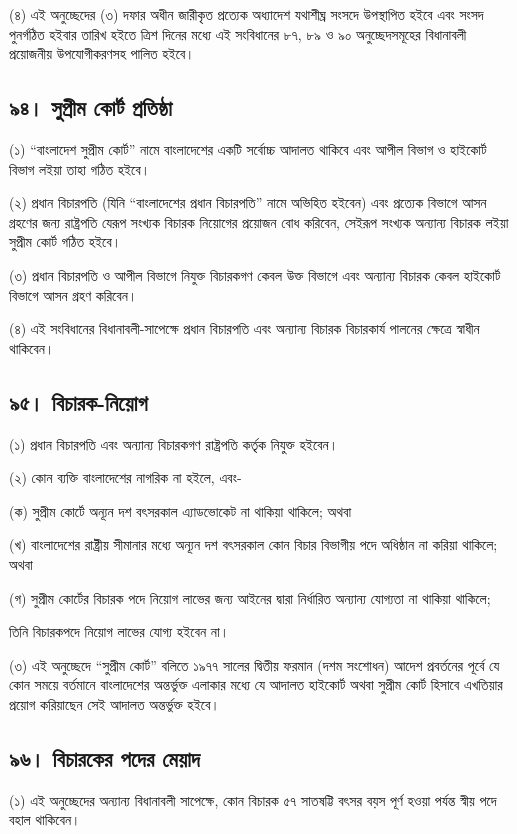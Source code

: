 \documentclass[11pt]{article}
\begin{document}
(৪) এই অনুচ্ছেদের (৩) দফার অধীন জারীকৃত প্রত্যেক অধ্যাদেশ যথাশীঘ্র সংসদে
    উপস্থাপিত হইবে এবং সংসদ পুনর্গঠিত হইবার তারিখ হইতে ত্রিশ দিনের মধ্যে এই
    সংবিধানের ৮৭, ৮৯ ও ৯০ অনুচ্ছেদসমূহের বিধানাবলী প্রয়োজনীয় উপযোগীকরণসহ পালিত
    হইবে।

\subsection{৯৪। সুপ্রীম কোর্ট প্রতিষ্ঠা}
\label{sec:orgaefd4ce}
(১) “বাংলাদেশ সুপ্রীম কোর্ট” নামে বাংলাদেশের একটি সর্বোচ্চ আদালত থাকিবে
    এবং আপীল বিভাগ ও হাইকোর্ট বিভাগ লইয়া তাহা গঠিত হইবে।

(২) প্রধান বিচারপতি (যিনি “বাংলাদেশের প্রধান বিচারপতি” নামে অভিহিত
    হইবেন) এবং প্রত্যেক বিভাগে আসন গ্রহণের জন্য রাষ্ট্রপতি যেরূপ সংখ্যক বিচারক
    নিয়োগের প্রয়োজন বোধ করিবেন, সেইরূপ সংখ্যক অন্যান্য বিচারক লইয়া সুপ্রীম কোর্ট
    গঠিত হইবে।

(৩) প্রধান বিচারপতি ও আপীল বিভাগে নিযুক্ত বিচারকগণ কেবল উক্ত বিভাগে এবং
    অন্যান্য বিচারক কেবল হাইকোর্ট বিভাগে আসন গ্রহণ করিবেন।

(৪) এই সংবিধানের বিধানাবলী-সাপেক্ষে প্রধান বিচারপতি এবং অন্যান্য বিচারক
    বিচারকার্য পালনের ক্ষেত্রে স্বাধীন থাকিবেন।

\subsection{৯৫। বিচারক-নিয়োগ}
\label{sec:org72ac0b0}
(১) প্রধান বিচারপতি এবং অন্যান্য বিচারকগণ রাষ্ট্রপতি কর্তৃক নিযুক্ত হইবেন।

(২) কোন ব্যক্তি বাংলাদেশের নাগরিক না হইলে, এবং-

(ক) সুপ্রীম কোর্টে অন্যূন দশ বৎসরকাল এ্যাডভোকেট না থাকিয়া থাকিলে; অথবা

(খ) বাংলাদেশের রাষ্ট্রীয় সীমানার মধ্যে অন্যূন দশ বৎসরকাল কোন বিচার বিভাগীয়
    পদে অধিষ্ঠান না করিয়া থাকিলে; অথবা

(গ) সুপ্রীম কোর্টের বিচারক পদে নিয়োগ লাভের জন্য আইনের দ্বারা নির্ধারিত
    অন্যান্য যোগ্যতা না থাকিয়া থাকিলে;

তিনি বিচারকপদে নিয়োগ লাভের যোগ্য হইবেন না।

(৩) এই অনুচ্ছেদে “সুপ্রীম কোর্ট” বলিতে ১৯৭৭ সালের দ্বিতীয় ফরমান (দশম সংশোধন)
    আদেশ প্রবর্তনের পূর্বে যে কোন সময়ে বর্তমানে বাংলাদেশের অন্তর্ভুক্ত এলাকার মধ্যে
    যে আদালত হাইকোর্ট অথবা সুপ্রীম কোর্ট হিসাবে এখতিয়ার প্রয়োগ করিয়াছেন সেই
    আদালত অন্তর্ভুক্ত হইবে।

\subsection{৯৬। বিচারকের পদের মেয়াদ}
\label{sec:org9a25a5e}
(১) এই অনুচ্ছেদের অন্যান্য বিধানাবলী সাপেক্ষে, কোন বিচারক ৫৭ সাতষট্টি বৎসর
    বয়স পূর্ণ হওয়া পর্যন্ত স্বীয় পদে বহাল থাকিবেন।
\end{document}
